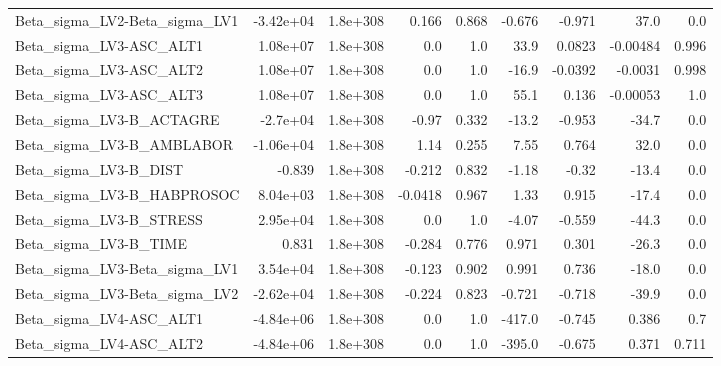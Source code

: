\begin{tabular}{lrrrrrrrr}
Beta\_sigma\_LV2-Beta\_sigma\_LV1     &   -3.42e+04 &     1.8e+308 &    0.166 &    0.868 &     -0.676 &      -0.971 &         37.0 &           0.0 \\
Beta\_sigma\_LV3-ASC\_ALT1           &    1.08e+07 &     1.8e+308 &      0.0 &      1.0 &       33.9 &      0.0823 &     -0.00484 &         0.996 \\
Beta\_sigma\_LV3-ASC\_ALT2           &    1.08e+07 &     1.8e+308 &      0.0 &      1.0 &      -16.9 &     -0.0392 &      -0.0031 &         0.998 \\
Beta\_sigma\_LV3-ASC\_ALT3           &    1.08e+07 &     1.8e+308 &      0.0 &      1.0 &       55.1 &       0.136 &     -0.00053 &           1.0 \\
Beta\_sigma\_LV3-B\_ACTAGRE          &    -2.7e+04 &     1.8e+308 &    -0.97 &    0.332 &      -13.2 &      -0.953 &        -34.7 &           0.0 \\
Beta\_sigma\_LV3-B\_AMBLABOR         &   -1.06e+04 &     1.8e+308 &     1.14 &    0.255 &       7.55 &       0.764 &         32.0 &           0.0 \\
Beta\_sigma\_LV3-B\_DIST             &      -0.839 &     1.8e+308 &   -0.212 &    0.832 &      -1.18 &       -0.32 &        -13.4 &           0.0 \\
Beta\_sigma\_LV3-B\_HABPROSOC        &    8.04e+03 &     1.8e+308 &  -0.0418 &    0.967 &       1.33 &       0.915 &        -17.4 &           0.0 \\
Beta\_sigma\_LV3-B\_STRESS           &    2.95e+04 &     1.8e+308 &      0.0 &      1.0 &      -4.07 &      -0.559 &        -44.3 &           0.0 \\
Beta\_sigma\_LV3-B\_TIME             &       0.831 &     1.8e+308 &   -0.284 &    0.776 &      0.971 &       0.301 &        -26.3 &           0.0 \\
Beta\_sigma\_LV3-Beta\_sigma\_LV1     &    3.54e+04 &     1.8e+308 &   -0.123 &    0.902 &      0.991 &       0.736 &        -18.0 &           0.0 \\
Beta\_sigma\_LV3-Beta\_sigma\_LV2     &   -2.62e+04 &     1.8e+308 &   -0.224 &    0.823 &     -0.721 &      -0.718 &        -39.9 &           0.0 \\
Beta\_sigma\_LV4-ASC\_ALT1           &   -4.84e+06 &     1.8e+308 &      0.0 &      1.0 &     -417.0 &      -0.745 &        0.386 &           0.7 \\
Beta\_sigma\_LV4-ASC\_ALT2           &   -4.84e+06 &     1.8e+308 &      0.0 &      1.0 &     -395.0 &      -0.675 &        0.371 &         0.711 \\

\end{tabular}
